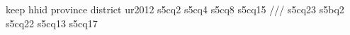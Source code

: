 keep hhid province district ur2012 s5cq2 s5cq4 s5cq8 s5cq15 ///
        s5cq23 s5bq2 s5cq22 s5cq13 s5cq17 
